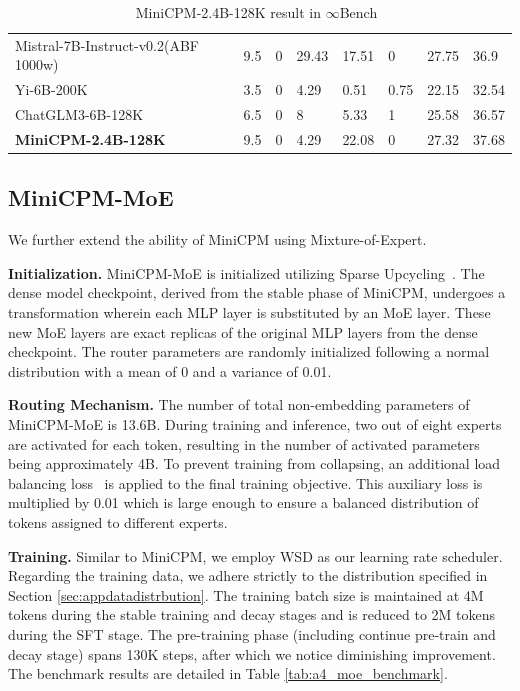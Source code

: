 \documentclass[dvipsnames]{article}
\begin{document}
\begin{table}[htpb]
{\begin{tabular}{m{4cm}m{1.4cm}m{1.0cm}m{1.0cm}m{1.2cm}m{1.2cm}m{1.2cm}m{1.2cm}}
Mistral-7B-Instruct-v0.2(ABF 1000w) & 9.5                   & 0          & 29.43      & 17.51       & 0         & 27.75 & 36.9               \\
Yi-6B-200K                          & 3.5                   & 0          & 4.29       & 0.51        & 0.75      & 22.15 & 32.54              \\
ChatGLM3-6B-128K                    & 6.5                   & 0          & 8          & 5.33        & 1         & 25.58 & 36.57              \\
\midrule
\textbf{MiniCPM-2.4B-128K}                   & 9.5                   & 0          & 4.29       & 22.08       & 0         & 27.32 & 37.68              \\
\bottomrule
\end{tabular}
}
\caption{MiniCPM-2.4B-128K result in $\infty$Bench~\citep{zhang2024infty} }
\label{tab:longcontext}
\end{table}

\vspace{-2mm}
\subsection{MiniCPM-MoE}
We further extend the ability of MiniCPM using Mixture-of-Expert. 

\textbf{Initialization.}
MiniCPM-MoE is initialized utilizing Sparse Upcycling~\citep{komatsuzaki2022sparse}. The dense model checkpoint, derived from the stable phase of MiniCPM, undergoes a transformation wherein each MLP layer is substituted by an MoE layer. These new MoE layers are exact replicas of the original MLP layers from the dense checkpoint. The router parameters are randomly initialized following a normal distribution with a mean of 0 and a variance of 0.01.

\textbf{Routing Mechanism.}
The number of total non-embedding parameters of MiniCPM-MoE is 13.6B. 
During training and inference, two out of eight experts are activated for each token, resulting in the number of activated parameters being approximately 4B. To prevent training from collapsing, an additional load balancing loss~\citep{fedus2022switch} is applied to the final training objective. This auxiliary loss is multiplied by 0.01 which is large enough to ensure a balanced distribution of tokens assigned to different experts.

\textbf{Training.}
 Similar to MiniCPM, we employ WSD as our learning rate scheduler. Regarding the training data, we adhere strictly to the distribution specified in Section \ref{sec:appdatadistrbution}. The training batch size is maintained at 4M tokens during the stable training and decay stages and is reduced to 2M tokens during the SFT stage. The pre-training phase (including continue pre-train and decay stage) spans 130K steps, after which we notice diminishing improvement. The benchmark results are detailed in Table \ref{tab:a4_moe_benchmark}.
\end{document}
